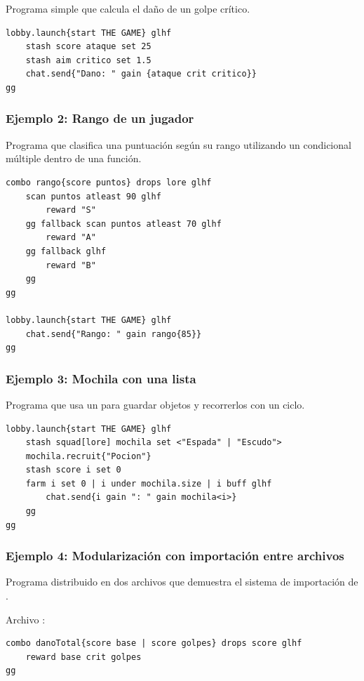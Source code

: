 Programa simple que calcula el daño de un golpe crítico.
\begin{lstlisting}
lobby.launch{start THE GAME} glhf
    stash score ataque set 25
    stash aim critico set 1.5
    chat.send{"Dano: " gain {ataque crit critico}}
gg
\end{lstlisting}

\subsubsection*{Ejemplo 2: Rango de un jugador}

Programa que clasifica una puntuación según su rango utilizando un condicional múltiple dentro de una función.
\begin{lstlisting}
combo rango{score puntos} drops lore glhf
    scan puntos atleast 90 glhf
        reward "S"
    gg fallback scan puntos atleast 70 glhf
        reward "A"
    gg fallback glhf
        reward "B"
    gg
gg

lobby.launch{start THE GAME} glhf
    chat.send{"Rango: " gain rango{85}}
gg
\end{lstlisting}

\subsubsection*{Ejemplo 3: Mochila con una lista}

Programa que usa un  para guardar objetos y recorrerlos con un ciclo.
\begin{lstlisting}
lobby.launch{start THE GAME} glhf
    stash squad[lore] mochila set <"Espada" | "Escudo">
    mochila.recruit{"Pocion"}
    stash score i set 0
    farm i set 0 | i under mochila.size | i buff glhf
        chat.send{i gain ": " gain mochila<i>}
    gg
gg
\end{lstlisting}

\subsubsection*{Ejemplo 4: Modularización con importación entre archivos}

Programa distribuido en dos archivos que demuestra el sistema de importación de \ggez.

Archivo :
\begin{lstlisting}
combo danoTotal{score base | score golpes} drops score glhf
    reward base crit golpes
gg
\end{lstlisting}

